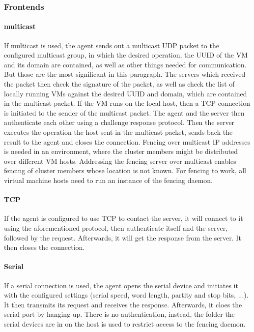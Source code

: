 \subsubsection{Frontends}
\paragraph{multicast}
If multicast is used, the agent sends out a multicast UDP packet
to the configured multicast group, in which the desired operation, the \ac{UUID}
of the \ac{VM} and its domain are contained, as well as other things needed
for communication. But those are the most significant in this paragraph.
The servers which received the packet then check the signature
of the packet, as well as check the list of locally running \acp{VM} against 
the desired \ac{UUID} and domain, which are contained in the multicast packet.
If the \ac{VM} runs on the local host, then a \ac{TCP} connection
is initiated to the sender of the multicast packet. The agent
and the server then authenticate each other using a challenge response protocol.
Then the server executes the operation the host sent in the multicast packet,
sends back the result to the agent and closes the connection.
Fencing over multicast IP addresses is needed in an environment, where the cluster members might
be distributed over different \ac{VM} hosts. Addressing the fencing server
over multicast enables fencing of cluster members whose location is not known.
For fencing to work, all virtual machine hosts need to run an instance of
the fencing daemon.
\paragraph{TCP}
If the agent is configured to use \ac{TCP} to contact the server,
it will connect to it using the aforementioned protocol, then authenticate itself and the server,
followed by the request. Afterwards, it will get the response from the server. It
then closes the connection.
\paragraph{Serial}
If a serial connection is used, the agent opens the serial device and initiates it with the
configured settings (serial speed, word length, partity and stop bits, ...).
It then transmits its request and receives the response. Afterwards, it cloes the
serial port by hanging up.
There is no authentication, instead, the folder the serial devices are in on the host
is used to restrict access to the fencing daemon.
